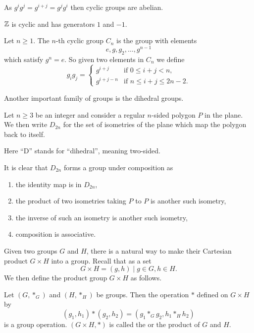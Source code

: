 As $g^ig^j=g^{i+j}=g^jg^i$ then cyclic groups are abelian.

\begin{example}
$\mathbb Z$ is cyclic and has generators $1$ and $-1$.
\end{example}

\begin{example}
Let $n\ge1$. The $n$-th cyclic group $C_n$ is the group with elements
\[ e, g, g_2, \dots, g^{n-1} \]
which satisfy $g^n=e$. So given two elements in $C_n$ we define
\[ g_ig_j=\begin{cases}
g^{i+j} & \text{if } 0\le i+j<n, \\
g^{i+j-n} & \text{if } n\le i+j\le 2n-2.
\end{cases} \]
\end{example}

Another important family of groups is the dihedral groups.

\begin{definition}
Let $n\ge3$ be an integer and consider a regular $n$-sided polygon $P$ in the plane. We then write $D_{2n}$ for the set of isometries of the plane which map the polygon back to itself.
\end{definition}

\begin{remark}
Here ``D'' stands for ``dihedral'', meaning two-sided.
\end{remark}

It is clear that $D_{2n}$ forms a group under composition as
\begin{enumerate}[label=(\roman*)]
\item the identity map is in $D_{2n}$,
\item the product of two isometries taking $P$ to $P$ is another such isometry,
\item the inverse of such an isometry is another such isometry,
\item composition is associative.
\end{enumerate}

Given two groups $G$ and $H$, there is a natural way to make their Cartesian product $G \times H$ into a group. Recall that as a set 
\[ G \times H = {(g,h)\mid g\in G, h\in H}. \]
We then define the product group $G\times H$ as follows.

\begin{definition}
Let $(G,\ast_G)$ and $(H,\ast_H)$ be groups. Then the operation $\ast$ defined on $G\times H$ by
\[ (g_1,h_1)\ast(g_2,h_2)=(g_1\ast_G g_2,h_1\ast_H h_2) \]
is a group operation. $(G \times H, \ast)$ is called the  or the product of $G$ and $H$.
\end{definition}

